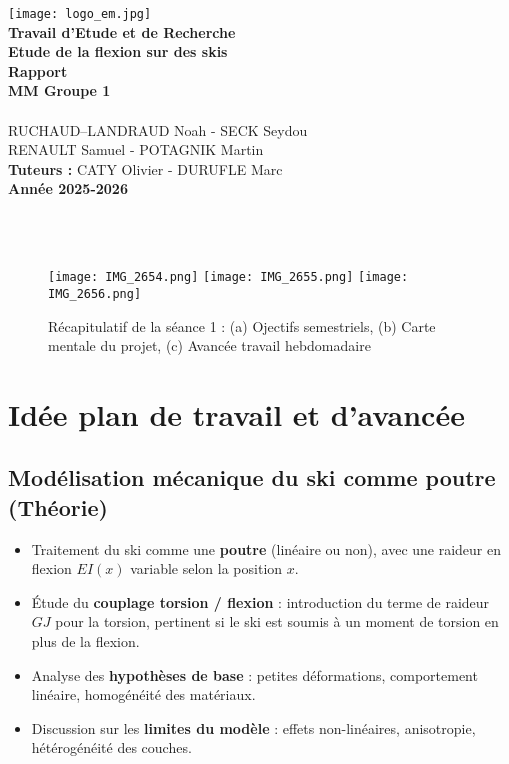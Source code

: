 \documentclass[12pt, a4paper]{article}
\begin{document}
\begin{titlepage}
    \centering
    \texttt{[image: logo\_em.jpg]}\\[5cm]
    
    {\LARGE \textbf{Travail d'Etude et de Recherche}}\\[0.3cm]
    {\large \textbf{Etude de la flexion sur des skis}}\\[1.5cm]
    {\large \textbf{Rapport}}\\[0.5cm]
    {\large \textbf{MM Groupe 1}}\\[7cm]
    
\\
    RUCHAUD--LANDRAUD Noah - SECK Seydou \\ RENAULT Samuel - POTAGNIK Martin\\[0.5cm]
    
    {\large \textbf{Tuteurs :} CATY Olivier - DURUFLE Marc}\\[2cm]
    
    {\large \textbf{Année 2025-2026}}
\end{titlepage}

\\\\
\begin{figure}[h!]
    \centering
    \texttt{[image: IMG\_2654.png]}
    \texttt{[image: IMG\_2655.png]}
    \texttt{[image: IMG\_2656.png]}
    \caption{Récapitulatif de la séance 1 : (a) Ojectifs semestriels, (b) Carte mentale du projet, (c) Avancée travail hebdomadaire}
    \label{fig:flexion_ski}
\end{figure}

\section{\textbf{Idée plan de travail et d'avancée}}

\subsection{Modélisation mécanique du ski comme poutre (Théorie)}

\begin{itemize}
  \item Traitement du ski comme une \textbf{poutre} (linéaire ou non), avec une raideur en flexion $EI(x)$ variable selon la position $x$.
  \item Étude du \textbf{couplage torsion / flexion} : introduction du terme de raideur $GJ$ pour la torsion, pertinent si le ski est soumis à un moment de torsion en plus de la flexion.
  \item Analyse des \textbf{hypothèses de base} : petites déformations, comportement linéaire, homogénéité des matériaux.
  \item Discussion sur les \textbf{limites du modèle} : effets non-linéaires, anisotropie, hétérogénéité des couches.
\end{itemize}
\end{document}
